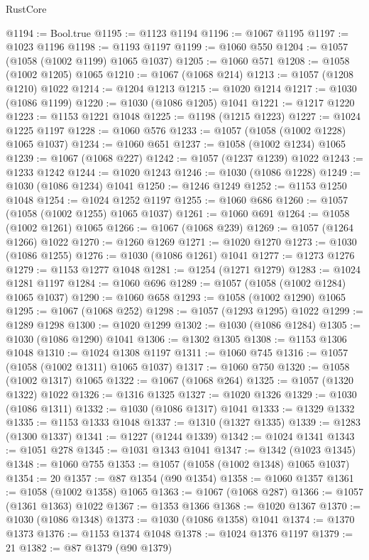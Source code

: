 \begin{lexlean}{RustCore}
\begin{coremodule}
@1194 := Bool.true
@1195 := @1123 @1194
@1196 := @1067 @1195
@1197 := @1023 @1196
@1198 := @1193 @1197
@1199 := @1060 @550
@1204 := @1057 (@1058 (@1002 @1199) @1065 @1037)
@1205 := @1060 @571
@1208 := @1058 (@1002 @1205) @1065
@1210 := @1067 (@1068 @214)
@1213 := @1057 (@1208 @1210) @1022
@1214 := @1204 @1213
@1215 := @1020 @1214
@1217 := @1030 (@1086 @1199)
@1220 := @1030 (@1086 @1205) @1041
@1221 := @1217 @1220
@1223 := @1153 @1221 @1048
@1225 := @1198 (@1215 @1223)
@1227 := @1024 @1225 @1197
@1228 := @1060 @576
@1233 := @1057 (@1058 (@1002 @1228) @1065 @1037)
@1234 := @1060 @651
@1237 := @1058 (@1002 @1234) @1065
@1239 := @1067 (@1068 @227)
@1242 := @1057 (@1237 @1239) @1022
@1243 := @1233 @1242
@1244 := @1020 @1243
@1246 := @1030 (@1086 @1228)
@1249 := @1030 (@1086 @1234) @1041
@1250 := @1246 @1249
@1252 := @1153 @1250 @1048
@1254 := @1024 @1252 @1197
@1255 := @1060 @686
@1260 := @1057 (@1058 (@1002 @1255) @1065 @1037)
@1261 := @1060 @691
@1264 := @1058 (@1002 @1261) @1065
@1266 := @1067 (@1068 @239)
@1269 := @1057 (@1264 @1266) @1022
@1270 := @1260 @1269
@1271 := @1020 @1270
@1273 := @1030 (@1086 @1255)
@1276 := @1030 (@1086 @1261) @1041
@1277 := @1273 @1276
@1279 := @1153 @1277 @1048
@1281 := @1254 (@1271 @1279)
@1283 := @1024 @1281 @1197
@1284 := @1060 @696
@1289 := @1057 (@1058 (@1002 @1284) @1065 @1037)
@1290 := @1060 @658
@1293 := @1058 (@1002 @1290) @1065
@1295 := @1067 (@1068 @252)
@1298 := @1057 (@1293 @1295) @1022
@1299 := @1289 @1298
@1300 := @1020 @1299
@1302 := @1030 (@1086 @1284)
@1305 := @1030 (@1086 @1290) @1041
@1306 := @1302 @1305
@1308 := @1153 @1306 @1048
@1310 := @1024 @1308 @1197
@1311 := @1060 @745
@1316 := @1057 (@1058 (@1002 @1311) @1065 @1037)
@1317 := @1060 @750
@1320 := @1058 (@1002 @1317) @1065
@1322 := @1067 (@1068 @264)
@1325 := @1057 (@1320 @1322) @1022
@1326 := @1316 @1325
@1327 := @1020 @1326
@1329 := @1030 (@1086 @1311)
@1332 := @1030 (@1086 @1317) @1041
@1333 := @1329 @1332
@1335 := @1153 @1333 @1048
@1337 := @1310 (@1327 @1335)
@1339 := @1283 (@1300 @1337)
@1341 := @1227 (@1244 @1339)
@1342 := @1024 @1341
@1343 := @1051 @278
@1345 := @1031 @1343 @1041
@1347 := @1342 (@1023 @1345)
@1348 := @1060 @755
@1353 := @1057 (@1058 (@1002 @1348) @1065 @1037)
@1354 := 20
@1357 := @87 @1354 (@90 @1354)
@1358 := @1060 @1357
@1361 := @1058 (@1002 @1358) @1065
@1363 := @1067 (@1068 @287)
@1366 := @1057 (@1361 @1363) @1022
@1367 := @1353 @1366
@1368 := @1020 @1367
@1370 := @1030 (@1086 @1348)
@1373 := @1030 (@1086 @1358) @1041
@1374 := @1370 @1373
@1376 := @1153 @1374 @1048
@1378 := @1024 @1376 @1197
@1379 := 21
@1382 := @87 @1379 (@90 @1379)

\end{coremodule}
\end{lexlean}
